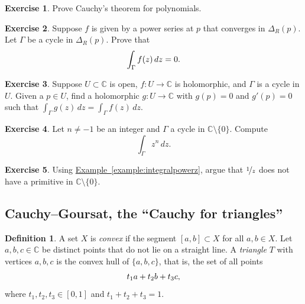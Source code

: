 \documentclass[12pt,openany]{book}
\newcommand{\avoidbreak}{\postdisplaypenalty=100}
\newcommand{\C}{{\mathbb{C}}}
\newcommand{\myindex}[1]{#1\index{#1}}
\newcommand{\myquote}[1]{``#1''}
\theoremstyle{plain}
\theoremstyle{remark}
\theoremstyle{definition}
\newtheorem{defn}[thm]{Definition}
\newenvironment{exbox}{%
    \def\FrameCommand{\vrule width 1pt \relax\hspace{10pt}}%
    \MakeFramed{\advance\hsize-\width\FrameRestore}%
}{%
    \endMakeFramed
}
\theoremstyle{exercise}
\newtheorem{exercise}{Exercise}[section]
\theoremstyle{example}
\newcommand{\exerciseref}[1]{\hyperref[#1]{Exercise~\ref*{#1}}}
\newcommand{\exampleref}[1]{\hyperref[#1]{Example~\ref*{#1}}}
\begin{document}
\begin{exbox}
\begin{exercise}
Prove Cauchy's theorem for polynomials.
\end{exercise}

\begin{exercise}
Suppose $f$ is given by a power series at $p$ that converges in $\Delta_R(p)$.  Let
$\Gamma$ be a cycle in $\Delta_R(p)$.  Prove that
\begin{equation*}
\int_\Gamma f(z) \, dz = 0 .
\avoidbreak
\end{equation*}
\end{exercise}

\begin{exercise}
Suppose $U \subset \C$ is open, $f \colon U \to \C$ is holomorphic, and
$\Gamma$ is a cycle in $U$.  
Given a $p \in U$, find a holomorphic $g \colon U \to \C$ with $g(p) = 0$
and $g'(p) = 0$ such that $\int_\Gamma g(z)\, dz = \int_\Gamma f(z) \, dz$.
\end{exercise}

\begin{exercise}
Let $n \neq -1$ be an integer and $\Gamma$ a cycle in $\C \setminus \{ 0 \}$.
Compute
\begin{equation*}
\int_\Gamma z^n \, dz .
\end{equation*}
\end{exercise}

\begin{exercise}
Using \exampleref{example:integralpowerz}, argue that $\nicefrac{1}{z}$ does
not have a primitive in $\C \setminus \{ 0 \}$.
\end{exercise}
\end{exbox}

\subsection{Cauchy--Goursat, the \myquote{Cauchy for triangles}}

\begin{defn}
A set $X$ is \emph{\myindex{convex}} if the segment $[a,b] \subset X$ for all $a,b \in
X$.
Let $a,b,c \in \C$ be distinct points that do not lie on a
straight line.
A \emph{\myindex{triangle}} $T$
with vertices $a,b,c$ is the convex hull
of $\{ a,b,c \}$, that is,
the set of all points
\begin{equation*}
t_1 a + t_2 b + t_3 c ,
\avoidbreak
\end{equation*}
where $t_1,t_2,t_3 \in [0,1]$ and $t_1+t_2+t_3 = 1$.
\end{defn}
\end{document}
